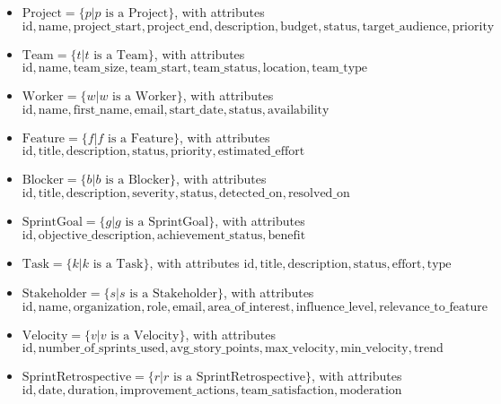 \documentclass[11pt]{article}
\begin{document}
\begin{itemize}
    \item $\text{Project} = \{p | p \text{ is a Project}\}$, with attributes $\text{id}, \text{name}, \text{project\_start}, \text{project\_end}, \text{description}, \text{budget}, \text{status}, \text{target\_audience}, \text{priority}$
    \item $\text{Team} = \{t | t \text{ is a Team}\}$, with attributes $\text{id}, \text{name}, \text{team\_size}, \text{team\_start}, \text{team\_status}, \text{location}, \text{team\_type}$
    \item $\text{Worker} = \{w | w \text{ is a Worker}\}$, with attributes $\text{id}, \text{name}, \text{first\_name}, \text{email}, \text{start\_date}, \text{status}, \text{availability}$
    \item $\text{Feature} = \{f | f \text{ is a Feature}\}$, with attributes $\text{id}, \text{title}, \text{description}, \text{status}, \text{priority}, \text{estimated\_effort}$
    \item $\text{Blocker} = \{b | b \text{ is a Blocker}\}$, with attributes $\text{id}, \text{title}, \text{description}, \text{severity}, \text{status}, \text{detected\_on}, \text{resolved\_on}$
    \item $\text{SprintGoal} = \{g | g \text{ is a SprintGoal}\}$, with attributes $\text{id}, \text{objective\_description}, \text{achievement\_status}, \text{benefit}$
    \item $\text{Task} = \{k | k \text{ is a Task}\}$, with attributes $\text{id}, \text{title}, \text{description}, \text{status}, \text{effort}, \text{type}$
    \item $\text{Stakeholder} = \{s | s \text{ is a Stakeholder}\}$, with attributes $\text{id}, \text{name}, \text{organization}, \text{role}, \text{email}, \text{area\_of\_interest}, \text{influence\_level}, \text{relevance\_to\_feature}$
    \item $\text{Velocity} = \{v | v \text{ is a Velocity}\}$, with attributes $\text{id}, \text{number\_of\_sprints\_used}, \text{avg\_story\_points}, \text{max\_velocity}, \text{min\_velocity}, \text{trend}$
    \item $\text{SprintRetrospective} = \{r | r \text{ is a SprintRetrospective}\}$, with attributes $\text{id}, \text{date}, \text{duration}, \text{improvement\_actions}, \text{team\_satisfaction}, \text{moderation}$
\end{itemize}
\end{document}
